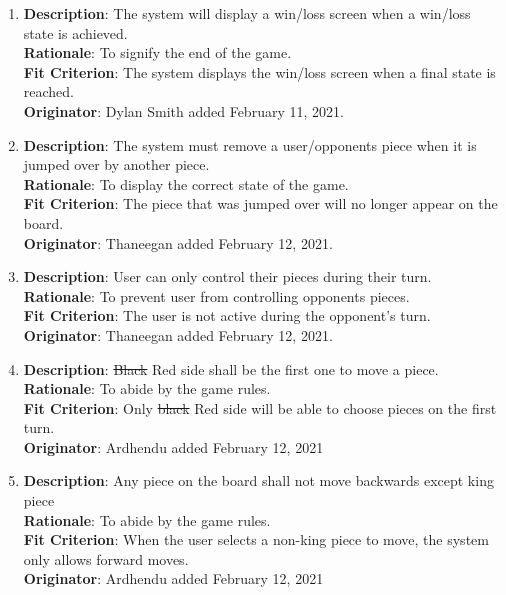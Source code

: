 \documentclass[12pt, titlepage]{article}
\begin{document}
\begin{enumerate}[{FR}1.]
    \item\textbf{Description}: The system will display a win/loss screen when a win/loss state is achieved.\\
        \textbf{Rationale}: To signify the end of the game.\\
        \textbf{Fit Criterion}: The system displays the win/loss screen when a final state is reached.\\
        \textbf{Originator}: Dylan Smith added February 11, 2021.
    
     \item\textbf{Description}: The system must remove a user/opponents piece when it is jumped over by another piece.  \\
        \textbf{Rationale}: To display the correct state of the game.\\
        \textbf{Fit Criterion}: The piece that was jumped over will no longer appear on the board.\\
        \textbf{Originator}: Thaneegan added February 12, 2021.
        
    \item\textbf{Description}: User can only control their pieces during their turn.\\
        \textbf{Rationale}: To prevent user from controlling opponents pieces. \\
        \textbf{Fit Criterion}: The user is not active during the opponent's turn. \\
        \textbf{Originator}: Thaneegan added February 12, 2021.  
        
    \item\textbf{Description}: \st{Black} Red side shall be the first one to move a piece.\\
        \textbf{Rationale}: To abide by the game rules.\\
        \textbf{Fit Criterion}:  Only \st{black} Red side will be able to choose pieces on the first turn.\\
        \textbf{Originator}: Ardhendu added February 12, 2021 
        
    \item\textbf{Description}: Any piece on the board shall not move backwards except king piece\\
        \textbf{Rationale}: To abide by the game rules. \\
        \textbf{Fit Criterion}: When the user selects a non-king piece to move, the system only allows forward moves.\\
        \textbf{Originator}: Ardhendu added February 12, 2021 
    

\end{enumerate}
\end{document}
